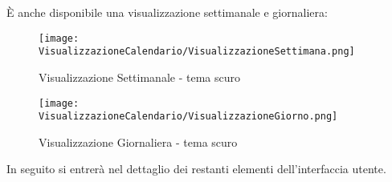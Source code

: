 \clearpage
\noindent È anche disponibile una visualizzazione settimanale e giornaliera:
\begin{figure}[H]
    \centering
    \texttt{[image: VisualizzazioneCalendario/VisualizzazioneSettimana.png]}
    \caption{Visualizzazione Settimanale - tema scuro}
\end{figure}
\begin{figure}[H]
    \centering
    \texttt{[image: VisualizzazioneCalendario/VisualizzazioneGiorno.png]}
    \caption{Visualizzazione Giornaliera - tema scuro}
\end{figure}
\noindent In seguito si entrerà nel dettaglio dei restanti elementi dell'interfaccia utente.